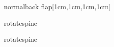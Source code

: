 \documentclass[coverwidth=148mm, coverheight=210mm, spinewidth=30mm,
flapwidth=7cm, wrapwidth=5mm, 11pt]{bookcover}
\begin{document}
\begin{bookcover}
\begin{bookcoverelement}{normal}{back flap}[1cm,1cm,1cm,1cm]
  \end{bookcoverelement}
  
  \begin{bookcoverelement}{rotate}{spine}
    \color{orange!70!white}

   \LARGE\sffamily\bfseries
   \hspace{.03\partheight}

  \end{bookcoverelement}
  

  \begin{bookcoverelement}{rotate}{spine}
    \color{orange!70!white}%
    \fontsize{32}{40}\selectfont\sffamily\bfseries%
    \hspace{.42\partheight}    
  \end{bookcoverelement}

\end{bookcover}
\end{document}
